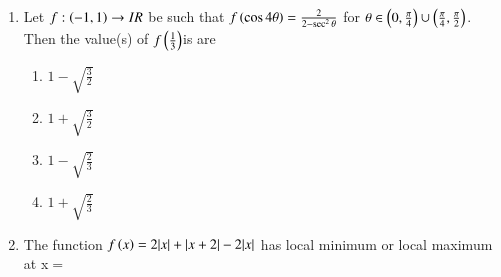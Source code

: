 \documentclass[journal,12pt,twocolumn]{IEEEtran}
\theoremstyle{remark}
\begin{document}
\begin{enumerate}[start=2]
\begin{enumerate} [label=(\alph*)]
\item $f$ is not invertible  on $\brak{0,1}$
\item$f\neq{f^{-1}}$ on $(0,1)$ and $f^{1}(b)=\frac{1}{f^{1}\brak{0}}$
\item(c)$f=f^{-1}$ on $\brak{0,1}$ and $f^{1}\brak{b}=\frac{1}{f^{1}\brak{0}}$
\item$f^{-1} $is differentiable $(0,1)$
\end{enumerate}
\item Let $f:\left(-1,1\right)\rightarrow{IR}$ be  such that $f\left(\cos{4\theta}\right) =\frac{2}{2-\sec^2{\theta}}$ for $\theta \in \left(0,\frac{\pi}{4}\right)\cup\left(\frac{\pi}{4},\frac{\pi}{2}\right)$. Then the value(s) of $f\left(\frac{1}{3}\right)$is are
\begin{multicols}{2}
\begin{enumerate} [label=(\alph*)]
\item $1-\sqrt{\frac{3}{2}}$  
\item $1+\sqrt{\frac{3}{2}}$
\item $1-\sqrt{\frac{2}{3}}$   
\item $1+\sqrt{\frac{2}{3}}$
\end{enumerate}
\end{multicols}
\item The function $f\left(x\right)=2|x|+|x+2|-2|x|$ has local minimum or local maximum at x$=$


\end{enumerate}
\end{document}
